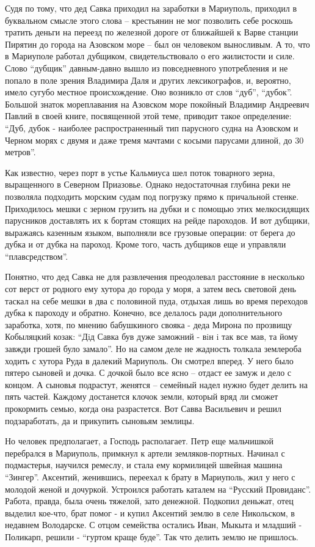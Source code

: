 Судя по тому, что дед Савка приходил на заработки в Мариуполь, приходил в
буквальном смысле этого слова – крестьянин не мог позволить себе роскошь
тратить деньги на  переезд по железной дороге от ближайшей к Варве станции
Пирятин до города на Азовском море – был он человеком выносливым. А то, что в
Мариуполе работал дубщиком, свидетельствовало о его жилистости и силе. Слово
\enquote{дубщик} давным-давно вышло из повседневного употребления и не попало в поле
зрения Владимира Даля и других лексикографов, и, вероятно, имело сугубо местное
происхождение. Оно возникло от слов \enquote{дуб}, \enquote{дубок}. Большой знаток мореплавания
на Азовском море покойный Владимир Андреевич Павлий в своей книге, посвященной
этой теме, приводит такое определение: \enquote{Дуб, дубок - наиболее распространенный
тип парусного судна на Азовском и Черном морях с двумя и даже тремя мачтами с
косыми парусами длиной, до 30 метров}.

Как известно, через порт в устье Кальмиуса шел поток товарного зерна,
выращенного в Северном Приазовье. Однако недостаточная глубина реки не
позволяла подходить морским судам под погрузку прямо к причальной стенке.
Приходилось мешки с зерном грузить на дубки и с помощью этих мелкосидящих
парусников доставлять их к бортам стоящих на рейде пароходов. И вот дубщики,
выражаясь казенным языком, выполняли все грузовые операции: от берега до дубка
и от дубка на пароход. Кроме того, часть дубщиков еще и управляли
\enquote{плавсредством}.

Понятно, что дед Савка не для развлечения преодолевал расстояние в несколько
сот верст от родного ему хутора до города у моря, а затем  весь световой день
таскал на себе мешки в два с половиной пуда, отдыхая лишь во время переходов
дубка к пароходу и обратно. Конечно, все делалось ради дополнительного
заработка, хотя, по мнению бабушкиного свояка - деда Мирона по прозвищу
Кобыляцкий козак: \enquote{Дiд Савка був дуже заможний - вiн i так все мав, та йому
завжди грошей було замало}. Но на самом деле не жадность толкала землероба
ходить с хутора Руда в далекий Мариуполь. Он смотрел вперед. У него было пятеро
сыновей и дочка. С дочкой было все ясно – отдаст ее замуж и дело с концом. А
сыновья подрастут, женятся – семейный надел нужно будет делить на пять частей.
Каждому достанется клочок земли, который вряд ли сможет прокормить семью, когда
она разрастется. Вот Савва Васильевич и решил подзаработать, да и прикупить
сыновьям землицы.

Но человек предполагает, а Господь располагает. Петр еще мальчишкой перебрался
в Мариуполь, примкнул к артели земляков-портных. Начинал с  подмастерья,
научился ремеслу, и стала ему кормилицей швейная машина \enquote{Зингер}. Аксентий,
женившись, переехал к брату в Мариуполь, жил у него с молодой женой и дочуркой.
Устроился работать каталем на \enquote{Русский Провиданс}. Работа, правда, была очень
тяжелой, зато денежной. Подкопил деньжат, отец выделил кое-что, брат помог - и
купил Аксентий землю в селе Никольском, в недавнем  Володарске. С отцом
семейства остались Иван, Мыкыта и младший - Поликарп, решили  - \enquote{гуртом краще
буде}. Так что делить землю не пришлось.

